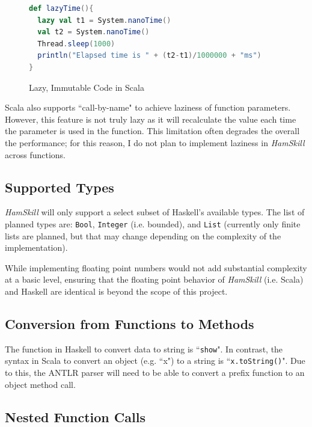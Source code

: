 \documentclass{report}
\begin{document}
\begin{figure}[H]
\begin{mdframed}
\begin{lstlisting}[language=Scala]
def lazyTime(){
  lazy val t1 = System.nanoTime()
  val t2 = System.nanoTime()
  Thread.sleep(1000)
  println("Elapsed time is " + (t2-t1)/1000000 + "ms")
}
\end{lstlisting}
\end{mdframed}
\caption{Lazy, Immutable Code in Scala}\label{fig:lazyImmutabilityInScala}
\end{figure}

Scala also supports ``call-by-name" to achieve laziness of function parameters.  However, this feature is not truly lazy as it will recalculate the value each time the parameter is used in the function.  This limitation often degrades the overall the performance; for this reason, I do not plan to implement laziness in \emph{HamSkill} across functions.

\subsection{Supported Types}

\emph{HamSkill} will only support a select subset of Haskell's available types.  The list of planned types are: {\tt Bool}, {\tt Integer} (i.e. bounded), and {\tt List} (currently only finite lists are planned, but that may change depending on the complexity of the implementation).

While implementing floating point numbers would not add substantial complexity at a basic level, ensuring that the floating point behavior of \emph{HamSkill} (i.e. Scala) and Haskell are identical is beyond the scope of this project.

\subsection{Conversion from Functions to Methods}

The function in Haskell to convert data to string is ``{\tt show}". In contrast, the syntax in Scala to convert an object (e.g. ``x") to a string is ``{\tt x.toString()}".  Due to this, the ANTLR parser will need to be able to convert a prefix function to an object method call.

\subsection{Nested Function Calls}\label{sec:nestedFunctionCalls}
\end{document}
